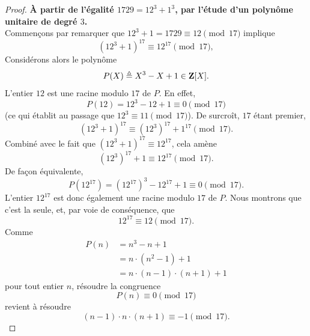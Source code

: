 \begin{proof}%
\textbf{À partir de l'égalité $1729 = 12^3 + 1^3$, par l'étude d'un polynôme unitaire de degré $3$.} 
\\
Commençons par remarquer que %
$12^3 + 1= 1729\equiv 12\pmod{17}$ implique 
%
\begin{equation}
  (12^3 + 1)^{17} \equiv 12^{17} \pmod{17}, 
\end{equation}
% 
Considérons alors le polynôme %
%
\begin{equation}
  P(X) \triangleq X^3 -X + 1 \in \mathbf{Z}[X].
\end{equation}
%
L'entier $12$ est une racine modulo $17$ de $P$. En effet, 
%
\begin{equation}
  P(12) = 12^3 - 12 + 1  \equiv 0 \pmod{17} 
\end{equation}
%
(ce qui établit au passage que $12^3 \equiv 11 \pmod{17}$). De surcroît, $17$ étant premier, 
%
\begin{equation}
  (12^3 + 1 )^{17} \equiv (12^3)^{17} + 1^{17} \pmod{17}.
\end{equation}
%
Combiné avec le fait que $(12^3 + 1)^{17} \equiv 12^{17}$, cela amène 
%
\begin{equation}
  (12^3)^{17} + 1  \equiv 12^{17} \pmod{17}.
\end{equation}
%
De façon équivalente, 
%
\begin{equation}
  P(12^{17}) = (12^{17})^3 - 12^{17} + 1 \equiv 0 \pmod{17}.
\end{equation}
%
L'entier $12^{17}$ est donc également une racine modulo $17$ de $P$. Nous montrons que c'est la seule, et, par voie de %
conséquence, que 
%
\begin{equation}
  12^{17} \equiv 12 \pmod{17}. 
\end{equation}
%
Comme 
%
\begin{align}
  P(n) &= n^3 - n  + 1 \\
  &= n \cdot (n^2 - 1) + 1 \\
  &= n \cdot (n-1) \cdot (n+1) +1  
\end{align}
%
pour tout entier $n$, résoudre la congruence 
%
\begin{equation}
  P(n) \equiv 0 \pmod{17} 
\end{equation}
%
revient à résoudre 
%
\begin{equation}
  (n-1) \cdot n \cdot (n+1) \equiv -1 \pmod{17}.

\end{equation}
\end{proof}
